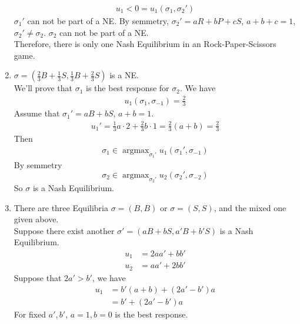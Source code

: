 \documentclass[12pt]{article}
\DeclareMathOperator*{\argmax}{argmax}
\begin{document}
\begin{enumerate}
          \begin{align*}
          u_1 < 0 = u_1(\sigma_1, \sigma_2')
          \end{align*}
          $\sigma_1'$ can not be part of a NE. 
          By semmetry, $\sigma_2' = aR + bP + cS$, $a + b + c = 1$, $\sigma_2' \neq \sigma_2$.
          $\sigma_2$ can not be part of a NE. \\
          Therefore, there is only one Nash Equilibrium in an Rock-Paper-Scissors game.
     \item $\sigma = (\frac{2}{3}B + \frac{1}{3}S, \frac{1}{3}B + \frac{2}{3}S)$ is a NE. \\
           We'll prove that $\sigma_1$ is the best response for $\sigma_2$.
           We have 
           \begin{align*}
           u_1(\sigma_1, \sigma_{-1}) = \frac{2}{3}
           \end{align*}
           Assume that $\sigma_1' = aB + bS$, $a + b = 1$.
           \begin{align*}
           u_1' = \frac{1}{3}a \cdot 2 + \frac{2}{3}b \cdot 1 = \frac{2}{3}(a + b) = \frac{2}{3}
           \end{align*}
           Then 
           \begin{align*}
           \sigma_1 \in \argmax_{\sigma_1'}u_1(\sigma_1', \sigma_{-1})
           \end{align*}
           By semmetry
           \begin{equation*}
           \sigma_2 \in \argmax_{\sigma_2'}u_2(\sigma_2', \sigma_{-2})
           \end{equation*}
           So $\sigma$ is a Nash Equilibrium.
     \item There are three Equilibria $\sigma = (B, B)$ or $\sigma = (S, S)$, 
            and the mixed one given above.\\ 
            Suppose there exist another $\sigma' = (aB + bS, a'B + b'S)$ is a Nash Equilibrium.
            \begin{align*}
                u_1 &= 2aa' + bb'\\
                u_2 &= aa' + 2bb'
            \end{align*}
            Suppose that $2a' > b'$, we have
            \begin{align*}
                u_1 &= b'(a + b) + (2a' - b')a \\
                    &= b' + (2a' - b')a 
            \end{align*}
            For fixed $a',b'$, $a = 1, b = 0$ is the best response. 

\end{enumerate}
\end{document}
